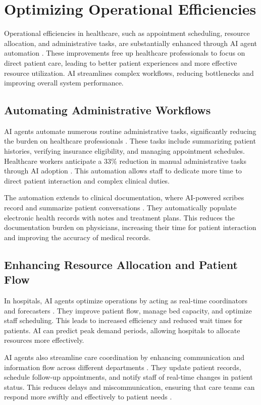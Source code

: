 \documentclass[12pt,a4paper]{article}
\begin{document}
\section{Optimizing Operational Efficiencies}
Operational efficiencies in healthcare, such as appointment scheduling, resource allocation, and administrative tasks, are substantially enhanced through AI agent automation \cite{salesforce.com}. These improvements free up healthcare professionals to focus on direct patient care, leading to better patient experiences and more effective resource utilization. AI streamlines complex workflows, reducing bottlenecks and improving overall system performance.

\subsection{Automating Administrative Workflows}
AI agents automate numerous routine administrative tasks, significantly reducing the burden on healthcare professionals \cite{ibm.com}. These tasks include summarizing patient histories, verifying insurance eligibility, and managing appointment schedules. Healthcare workers anticipate a 33\% reduction in manual administrative tasks through AI adoption \cite{ibm.com}. This automation allows staff to dedicate more time to direct patient interaction and complex clinical duties.

The automation extends to clinical documentation, where AI-powered scribes record and summarize patient conversations \cite{heidihealth.com}. They automatically populate electronic health records with notes and treatment plans. This reduces the documentation burden on physicians, increasing their time for patient interaction and improving the accuracy of medical records.

\subsection{Enhancing Resource Allocation and Patient Flow}
In hospitals, AI agents optimize operations by acting as real-time coordinators and forecasters \cite{retellai.com}. They improve patient flow, manage bed capacity, and optimize staff scheduling. This leads to increased efficiency and reduced wait times for patients. AI can predict peak demand periods, allowing hospitals to allocate resources more effectively.

AI agents also streamline care coordination by enhancing communication and information flow across different departments \cite{sully.ai}. They update patient records, schedule follow-up appointments, and notify staff of real-time changes in patient status. This reduces delays and miscommunication, ensuring that care teams can respond more swiftly and effectively to patient needs \cite{bcg.com}.
\end{document}
